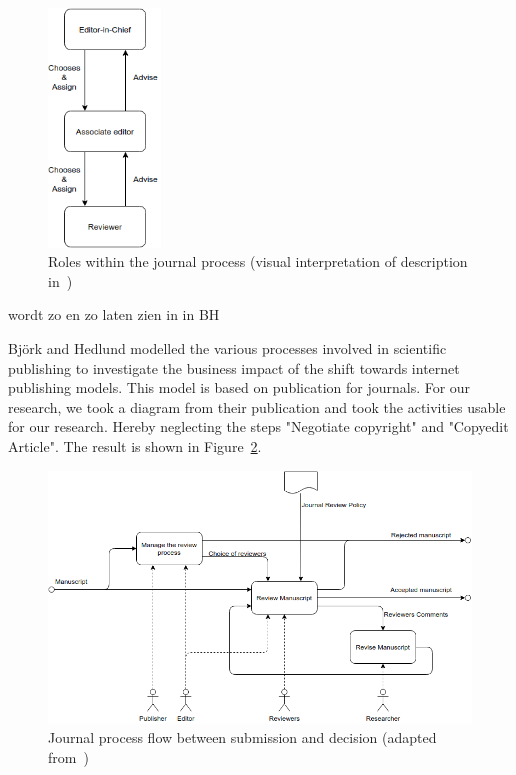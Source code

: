 \documentclass{ou-report}
\newcommand{\outline}[1]{{\color{blue} #1}}
\begin{document}
\begin{figure}[H]
\centering
\includegraphics[width=3cm]{images/c2013.drawio.png}
\caption{Roles within the journal process (visual interpretation of description in~\cite{C2013})}
\label{fig:c2013}
\end{figure}
\outline{
wordt zo en zo laten zien in in BH
}

Bj\"ork and Hedlund modelled the various processes involved in scientific
publishing to investigate the business impact of the shift towards internet
publishing models.
This model is based on publication for journals.
For our research, we took a diagram from their publication and took the activities usable for our research.
Hereby neglecting the steps "Negotiate copyright" and "Copyedit Article". The result is shown in Figure~\ref{fig:bh2004_a22331}.


\begin{figure}[H]
\centering
\includegraphics[width=14cm]{images/bh2004_dia_a22331_part.drawio.png}
\caption{Journal process flow between submission and decision (adapted
from~\cite[diagram A22331]{BH2004})}
\label{fig:bh2004_a22331}
\end{figure}
\end{document}
